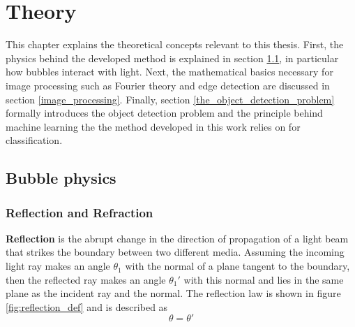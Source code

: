 \chapter{Theory}\label{theory}
This chapter explains the theoretical concepts relevant to this thesis. First, the physics behind the developed method is explained in section \ref{bubble_physics}, in particular how bubbles interact with light. Next, the mathematical basics necessary for image processing such as Fourier theory and edge detection are discussed in section \ref{image_processing}. Finally, section \ref{the_object_detection_problem} formally introduces the object detection problem and the principle behind machine learning the the method developed in this work relies on for classification.

	\section{Bubble physics} \label{bubble_physics}

		\subsection{Reflection and Refraction}
			\textbf{Reflection} is the abrupt change in the direction of propagation of a light beam that strikes the boundary between two different media. Assuming the incoming light ray makes an angle $\theta_1$ with the normal of a plane tangent to the boundary, then the reflected ray makes an angle $\theta_1'$ with this normal and lies in the same plane as the incident ray and the normal. The reflection law is shown in figure \ref{fig:reflection_def} and is described as
			\begin{equation}
				\theta = \theta'
			\end{equation}
			
